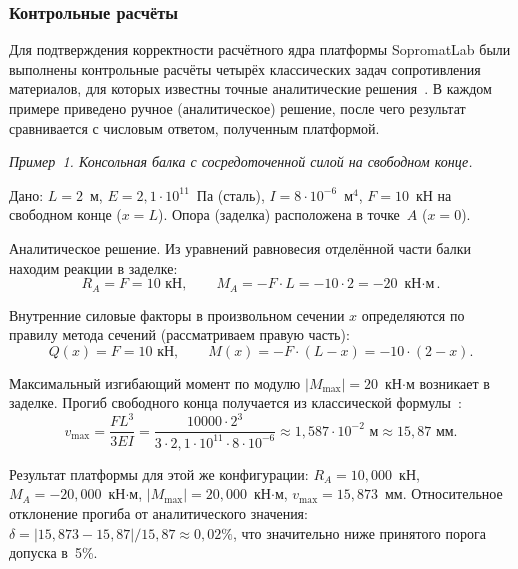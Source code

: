 \subsubsection{Контрольные расчёты}

Для подтверждения корректности расчётного ядра платформы SopromatLab были выполнены контрольные расчёты четырёх классических задач сопротивления материалов, для которых известны точные аналитические решения~\cite{feodosev, timoshenko, gere2018}. В каждом примере приведено ручное (аналитическое) решение, после чего результат сравнивается с числовым ответом, полученным платформой.

\textit{Пример~1. Консольная балка с сосредоточенной силой на свободном конце.}

Дано: $L = 2$~м, $E = 2{,}1 \cdot 10^{11}$~Па (сталь), $I = 8 \cdot 10^{-6}$~м$^4$, $F = 10$~кН на свободном конце ($x = L$). Опора (заделка) расположена в точке~$A$ ($x = 0$).

Аналитическое решение. Из уравнений равновесия отделённой части балки находим реакции в заделке:
\begin{equation}
  R_A = F = 10\text{ кН}, \qquad M_A = -F \cdot L = -10 \cdot 2 = -20 \text{ кН$\cdot$м}.
  \label{eq:ex1_reactions}
\end{equation}

Внутренние силовые факторы в произвольном сечении $x$ определяются по правилу метода сечений (рассматриваем правую часть):
\begin{equation}
  Q(x) = F = 10 \text{ кН}, \qquad M(x) = -F \cdot (L - x) = -10 \cdot (2 - x).
  \label{eq:ex1_QM}
\end{equation}

Максимальный изгибающий момент по модулю $|M_{\max}| = 20$~кН$\cdot$м возникает в заделке. Прогиб свободного конца получается из классической формулы~\cite{feodosev}:
\begin{equation}
  v_{\max} = \frac{F L^3}{3 E I} = \frac{10000 \cdot 2^3}{3 \cdot 2{,}1 \cdot 10^{11} \cdot 8 \cdot 10^{-6}} \approx 1{,}587 \cdot 10^{-2} \text{ м} \approx 15{,}87 \text{ мм}.
  \label{eq:ex1_vmax}
\end{equation}

Результат платформы для этой же конфигурации: $R_A = 10{,}000$~кН, $M_A = -20{,}000$~кН$\cdot$м, $|M_{\max}| = 20{,}000$~кН$\cdot$м, $v_{\max} = 15{,}873$~мм. Относительное отклонение прогиба от аналитического значения: $\delta = |15{,}873 - 15{,}87| / 15{,}87 \approx 0{,}02\%$, что значительно ниже принятого порога допуска в~5\%.

